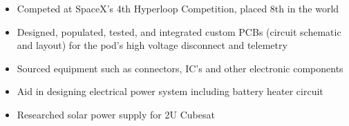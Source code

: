 \begin{comment}
\cvsection{Education}
\cvevent{Bachelor of Electrical Engineering Co-op Program}{\faUniversity Memorial University of Newfoundland}{Sept 2016 -- Ongoing}{NL, Canada}
Dean’s List 2016-2017 \hspace{0.125cm}%
\linebreak Expected Graduation: 2021
\medskip
\end{comment}

\begin{comment}
\cvsection{Achievements}

\cvachievement{\hspace{0.125cm}\faBookmarkO}{Alfred and Annie Chan Electrical Engineering Scholarship}{2017}

\cvachievement{\hspace{0.125cm}\faBookmarkO}{The Professional Engineers and Geoscientists of Newfoundland and Labrador Engineering Scholarship
}{2017}



\smallskip\divider\smallskip

\cvachievement{\faTrophy}{Duke of Edinburgh’s Award Bronze \& Silver Standard}{2013, 2016}

\divider
\cvachievement{\faTrophy}{Provincial Chess Champion; Competitor at Canadian Chess Challenge}{2012-2015}
\smallskip
\end{comment}

\begin{itemize}
\item Competed at SpaceX's 4th Hyperloop Competition, placed 8th in the world
\item Designed, populated, tested, and integrated custom PCBs (circuit schematic and layout) for the pod's high voltage disconnect and telemetry 
\item Sourced equipment such as connectors, IC's and other electronic components
\end{itemize}

\divider

\begin{itemize}
\item Aid in designing electrical power system including battery heater circuit
\item Researched solar power supply for 2U Cubesat
\end{itemize}

